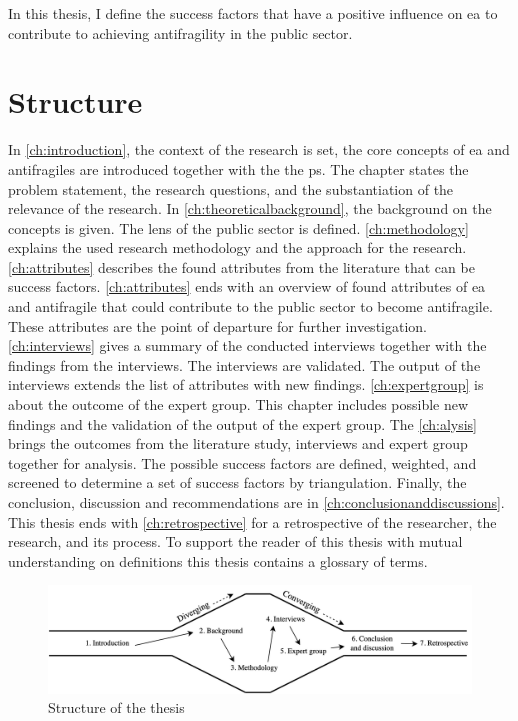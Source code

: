 In this thesis, I define the success factors that have a positive influence on \acrfull{ea} to contribute to achieving \gls{antifragility} in the public sector.

\section{Structure}
\label{sec:structure}
In \cref{ch:introduction}, the context of the research is set, the core concepts of \acrshort{ea} and \glspl{antifragile} are introduced together with the the \gls{ps}. The chapter states the problem statement, the research questions, and the substantiation of the relevance of the research. In \cref{ch:theoreticalbackground}, the background on the concepts is given. The lens of the public sector is defined. \cref{ch:methodology} explains the used research methodology and the approach for the research. \cref{ch:attributes} describes the found attributes from the literature that can be success factors. \cref{ch:attributes} ends with an overview of found attributes of \acrshort{ea} and \gls{antifragile} that could contribute to the public sector to become \gls{antifragile}. These attributes are the point of departure for further investigation. \cref{ch:interviews} gives a summary of the conducted interviews together with the findings from the interviews. The interviews are validated. The output of the interviews extends the list of attributes with new findings. \cref{ch:expertgroup} is about the outcome of the expert group. This chapter includes possible new findings and the validation of the output of the expert group. The \cref{ch:alysis} brings the outcomes from the literature study, interviews and expert group together for analysis. The possible success factors are defined, weighted, and screened to determine a set of success factors by triangulation. Finally, the conclusion, discussion and recommendations are in \cref{ch:conclusionanddiscussions}. This thesis ends with \cref{ch:retrospective} for a retrospective of the researcher, the research, and its process. To support the reader of this thesis with mutual understanding on definitions this thesis contains a glossary of terms.

\begin{figure}[H]
	\centering
	\includegraphics[width=0.9\linewidth]{images/structure}
	\caption[Structure of the thesis]{Structure of the thesis}
	\label{fig:structure}
\end{figure}




